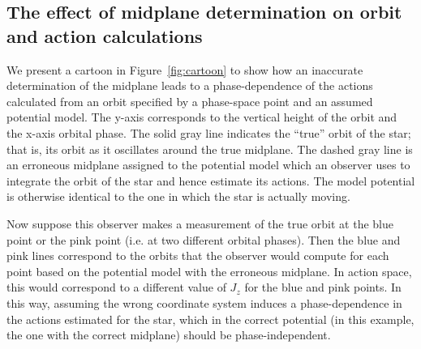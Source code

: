 \documentclass[twocolumn]{aastex62}
\begin{document}
\subsection{The effect of midplane determination on orbit and action calculations} \label{ssec:cartoon}
We present a cartoon in Figure~\ref{fig:cartoon} to show how an inaccurate
determination of the midplane leads to a phase-dependence of the actions calculated from an orbit specified by a phase-space point and an assumed potential model. The y-axis corresponds to the vertical height of the orbit and the x-axis orbital phase. The solid gray line indicates the ``true'' orbit of the star; that is, its orbit as it oscillates around the true midplane. The dashed gray line is an erroneous midplane assigned to the potential model which an observer uses to integrate the orbit of the star and hence estimate its actions. The model potential is otherwise identical to the one in which the star is actually moving.

Now suppose this observer makes a measurement of the true orbit at the blue
point or the pink point (i.e. at two different orbital phases). Then the blue and pink lines correspond to the orbits that the observer would compute for each point based on the potential model with the erroneous midplane. In action space, this would correspond to a different value of $J_z$ for the blue and pink points. In this way, assuming the wrong coordinate system induces a phase-dependence in the
actions estimated for the star, which in the correct potential (in this example, the one with the correct midplane) should be phase-independent.

\begin{figure*}
\caption{Cartoon showing the effect an error in the determination of the coordinate midplane can have on orbit integration and action estimation. The x-axis shows the
orbital phase and the y-axis the vertical height. The top gray curve depicts an example ``true'' orbit oscillating about the true midplane (horizontal
solid gray line). Consider an observer who erroneously assumes the
midplane is located at the horizontal dashed line. Suppose this
observer measures the phase-space position of the star at two different orbital phases (blue and pink points). If the observer were then to integrate the star's orbit using a model potential with the erroneous midplane, they would
obtain the blue and pink curves for the star's orbit, respectively. The actions estimated from these two  erroneous orbits would subsequently differ, both from each other and from the actions estimated for the true orbit (in the potential with the correct midplane). Hence an
incorrect midplane in the potential model assumed will induce phase-dependence in the actions estimated for a given star in that potential.}
\label{fig:cartoon}
\end{figure*}
\end{document}
